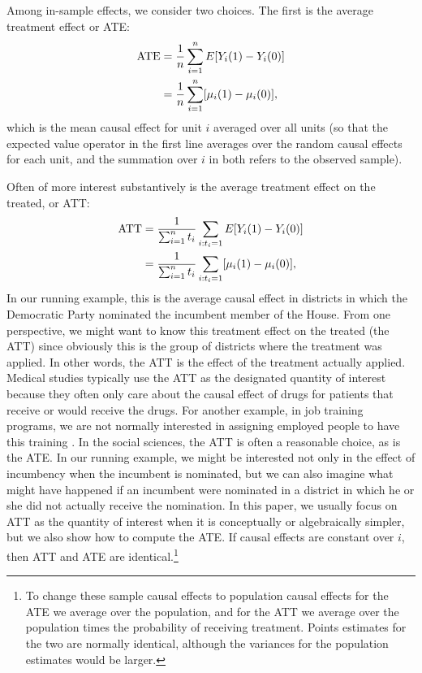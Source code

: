 \documentclass[11pt,titlepage]{article}
\begin{document}
Among in-sample effects, we consider two choices.  The first is the
average treatment effect or ATE:
\begin{align}
  \label{pate}
  \text{ATE} & = \frac{1}{n}\sum_{i=1}^n E[Y_i(1) - Y_i(0)] \notag\\
  &  = \frac{1}{n}\sum_{i=1}^n[\mu_i(1) - \mu_i(0)],
\end{align}
which is the mean causal effect for unit $i$ averaged over all units
(so that the expected value operator in the first line averages over
the random causal effects for each unit, and the summation over $i$ in
both refers to the observed sample).

Often of more interest substantively is the average treatment effect
on the treated, or ATT:
\begin{align}
  \label{att}
  \text{ATT} & = \frac{1}{\sum_{i=1}^n t_i}\sum_{i:t_i=1} E[Y_i(1) - Y_i(0)]\notag\\
  & = \frac{1}{\sum_{i=1}^n t_i}\sum_{i:t_i=1}[\mu_i(1) - \mu_i(0)],
\end{align}
In our running example, this is the average causal effect in districts
in which the Democratic Party nominated the incumbent member of the
House.  From one perspective, we might want to know this treatment
effect on the treated (the ATT) since obviously this is the group of
districts where the treatment was applied.  In other words, the ATT is
the effect of the treatment actually applied.  Medical studies
typically use the ATT as the designated quantity of interest because
they often only care about the causal effect of drugs for patients
that receive or would receive the drugs.  For another example, in job
training programs, we are not normally interested in assigning
employed people to have this training \citep{HecIchTod98}.  In the
social sciences, the ATT is often a reasonable choice, as is the ATE.
In our running example, we might be interested not only in the effect
of incumbency when the incumbent is nominated, but we can also imagine
what might have happened if an incumbent were nominated in a district
in which he or she did not actually receive the nomination.  In this
paper, we usually focus on ATT as the quantity of interest when it is
conceptually or algebraically simpler, but we also show how to compute
the ATE.  If causal effects are constant over $i$, then ATT and ATE
are identical.\footnote{To change these sample causal effects to
  population causal effects for the ATE we average over the
  population, and for the ATT we average over the population times the
  probability of receiving treatment.  Points estimates for the two
  are normally identical, although the variances for the population
  estimates would be larger.}
\end{document}
